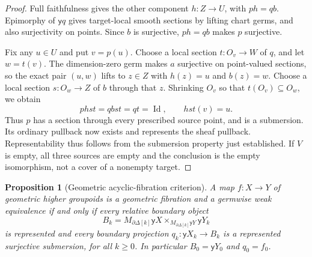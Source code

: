 \documentclass[12pt]{amsart}
\newtheorem{prop}[thm]{Proposition}
\theoremstyle{definition}
\theoremstyle{remark}
\numberwithin{equation}{section}
\newcommand{\y}{\mathsf y}
\DeclareMathOperator{\id}{Id}
\begin{document}
\begin{proof}
Full faithfulness gives the other component $h:Z\to U$,
with $ph=qb$. Epimorphy of $\y q$ gives target-local
smooth sections by lifting chart germs, and also
surjectivity on points. Since $b$ is surjective,
$ph=qb$ makes $p$ surjective.

Fix any $u\in U$ and put $v=p(u)$. Choose a local section
$t:O_v\to W$ of $q$, and let $w=t(v)$. The dimension-zero
germ makes $a$ surjective on point-valued sections, so
the exact pair $(u,w)$ lifts to $z\in Z$ with
$h(z)=u$ and $b(z)=w$. Choose a local section
$s:O_w\to Z$ of $b$ through that $z$. Shrinking $O_v$
so that $t(O_v)\subseteq O_w$, we obtain
\[
 phst=qbst=qt=\id,\qquad hst(v)=u.
\]
Thus $p$ has a section through every prescribed source
point, and is a submersion. Its ordinary pullback now
exists and represents the sheaf pullback. Representability
thus follows from the submersion property just established.
If $V$ is empty, all three sources are empty and the
conclusion is the empty isomorphism, not a cover of a
nonempty target.
\end{proof}

\begin{prop}[Geometric acyclic-fibration criterion]
\label{prop:ordinary-geometric-acyclic}
A map $f:X\to Y$ of geometric higher groupoids is a
geometric fibration and a germwise weak equivalence
if and only if every relative boundary object
\[
 B_k=M_{\partial\Delta[k]}\y X
       \times_{M_{\partial\Delta[k]}\y Y}\y Y_k
\]
is represented and every boundary projection
$q_k:\y X_k\to B_k$ is a represented surjective
submersion, for all $k\ge0$. In particular
$B_0=\y Y_0$ and $q_0=f_0$.
\end{prop}
\end{document}
